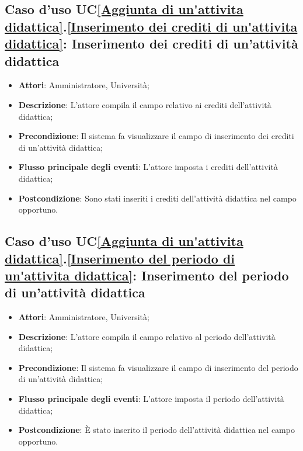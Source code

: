 \subsection{Caso d'uso UC\ref{Aggiunta di un'attivita didattica}.\ref{Inserimento dei crediti di un'attivita didattica}: Inserimento dei crediti di un'attività didattica}
\begin{itemize}
	\item \textbf{Attori}: Amministratore, Università;
	\item \textbf{Descrizione}: L'attore compila il campo relativo ai crediti dell'attività didattica;
	
	\item \textbf{Precondizione}: Il sistema fa visualizzare il campo di inserimento dei crediti di un'attività didattica;
	
	\item \textbf{Flusso principale degli eventi}: L'attore imposta i crediti dell'attività didattica;
	
	\item \textbf{Postcondizione}: Sono stati inseriti i crediti dell'attività didattica nel campo opportuno.
	
\end{itemize}

\subsection{Caso d'uso UC\ref{Aggiunta di un'attivita didattica}.\ref{Inserimento del periodo di un'attivita didattica}: Inserimento del periodo di un'attività didattica}
\begin{itemize}
	\item \textbf{Attori}: Amministratore, Università;
	\item \textbf{Descrizione}: L'attore compila il campo relativo al periodo dell'attività didattica;
	
	\item \textbf{Precondizione}: Il sistema fa visualizzare il campo di inserimento del periodo di un'attività didattica;
	
	\item \textbf{Flusso principale degli eventi}: L'attore imposta il periodo dell'attività didattica;
	
	\item \textbf{Postcondizione}: È stato inserito il periodo dell'attività didattica nel campo opportuno.
	
\end{itemize}

